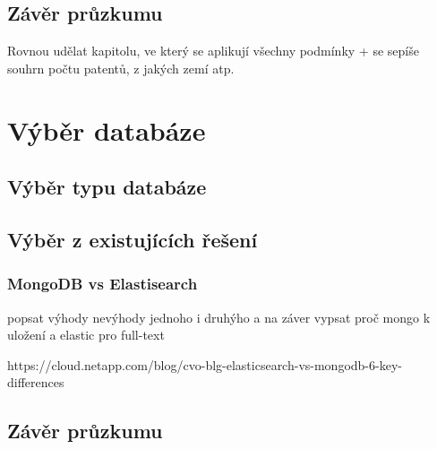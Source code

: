 \subsection{Závěr průzkumu}
Rovnou udělat kapitolu, ve který se aplikují všechny podmínky + se sepíše souhrn počtu patentů, z jakých zemí atp.


\section{Výběr databáze}
\subsection{Výběr typu databáze}
\subsection{Výběr z existujících řešení}
\subsubsection{MongoDB vs Elastisearch}
popsat výhody nevýhody jednoho i druhýho a na záver vypsat proč mongo k uložení a elastic pro full-text


https://cloud.netapp.com/blog/cvo-blg-elasticsearch-vs-mongodb-6-key-differences
\subsection{Závěr průzkumu}